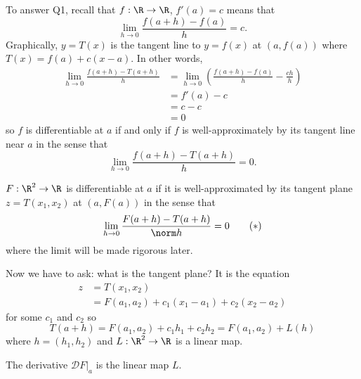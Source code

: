 \documentclass[a4paper]{article}
\newcommand*{\D}{\mathcal{D}}
\theoremstyle{definition}
\begin{document}
To answer Q1, recall that \(f: \R \to \R\), \(f'(a) = c\) means that
\[
  \lim_{h \to 0} \frac{f(a+h) - f(a)}{h} = c.
\]
Graphically, \(y = T(x)\) is the tangent line to \(y = f(x)\) at \((a, f(a))\) where \(T(x) = f(a) + c(x - a)\). In other words,
\begin{align*}
  \lim_{h \to 0} \frac{f(a + h) - T(a + h)}{h} &= \lim_{h \to 0} \left( \frac{f(a + h) - f(a)}{h} - \frac{ch}{h} \right) \\
                                               &= f'(a) -c \\
                                               &= c - c \\
                                               &= 0
\end{align*}
so \(f\) is differentiable at \(a\) if and only if \(f\) is well-approximately by its tangent line near \(a\) in the sense that
\[
  \lim_{h \to 0} \frac{f(a + h) - T(a + h)}{h} = 0.
\]

\begin{answer}[Answer to Q1]
  \(F: \R^2 \to \R\) is differentiable at \(a\) if it is well-approximated by its tangent plane \(z = T(x_1, x_2)\) at \((a, F(a))\) in the sense that
  \begin{equation}
    \label{eqn:derivative}
    \lim_{h \to 0} \frac{F(a + h) - T(a + h)}{\norm h} = 0
    \tag{\(\ast\)}
  \end{equation}
  where the limit will be made rigorous later.
\end{answer}

Now we have to ask: what is the tangent plane? It is the equation
\begin{align*}
  z &= T(x_1, x_2) \\
    &= F(a_1, a_2) +c_1(x_1 - a_1) + c_2(x_2 - a_2)
\end{align*}
for some \(c_1\) and \(c_2\) so
\[
  T(a + h) = F(a_1, a_2) + c_1h_1 + c_2h_2 = F(a_1, a_2) + L(h)
\]
where \(h = (h_1, h_2)\) and \(L: \R^2 \to \R\) is a linear map.

\begin{answer}[Answer to Q2]
  The derivative \(\D F|_a\) is the linear map \(L\).
\end{answer}
\end{document}
